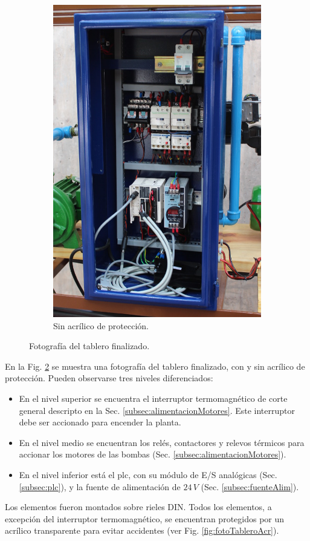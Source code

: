 \begin{figure}[t]
\begin{subfigure}[b]{0.48\textwidth}
\includegraphics[width=\textwidth]{Cap3-TableroElectrico/Images/IMG_5097.JPG}
 \caption{Sin acrílico de protección.}
 \label{fig:fotoTableroSAcr}
        \end{subfigure}
        \caption{Fotografía del tablero finalizado.}
        \label{fig:fotoTablero}
\end{figure}

En la Fig. \ref{fig:fotoTablero} se muestra
una fotografía del tablero finalizado, con y sin acrílico de protección.
Pueden observarse tres niveles diferenciados:
\begin{itemize}
 \item En el nivel superior se encuentra el interruptor termomagnético de corte
general descripto en la Sec. \ref{subsec:alimentacionMotores}.
Este interruptor debe ser accionado para encender la planta.
\item En el nivel medio se encuentran los relés, contactores y relevos térmicos
para accionar los motores de las bombas (Sec.
\ref{subsec:alimentacionMotores}).
\item En el nivel inferior está el
\gls{plc}, con su módulo de E/S analógicas (Sec. \ref{subsec:plc}), y la fuente
de alimentación de $24\,V$ (Sec.
\ref{subsec:fuenteAlim}).
\end{itemize}
Los elementos fueron montados sobre
rieles DIN.  Todos los elementos, a excepción del interruptor
termomagnético, se encuentran protegidos por un acrílico transparente para
evitar accidentes (ver Fig. \ref{fig:fotoTableroAcr}).

